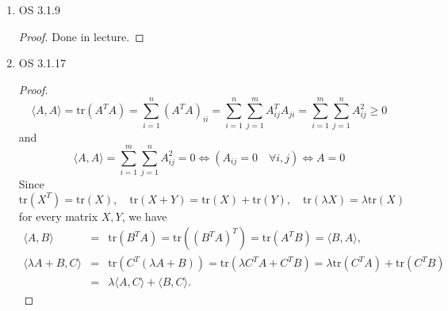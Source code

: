 \documentclass{amsart}
\begin{document}
\begin{enumerate}
\begin{proof}
	To prove it's an isomorphism, we only need that it's injective, i.e. $\ker(\pi^*)=0$.
	
	Let $f$ be a linear functional on $V/U$. Suppose $\pi^*(f)=0$, then $f(v+U)=0$ for all $v$, which means that $f={\bf 0}$ (the zero vector in $(V/U)^*$), therefore $\ker(\pi^*)=\{0\}$, hence $\pi^*$ is injective.
	
	Therefore $\pi*$ is a bijective linear map from $(V/U)^*$ and $U^0$, thus an isomorphism.
	
\end{proof}
\item {OS 3.1.9}
\begin{proof}
Done in lecture.
\end{proof}
		\item {OS 3.1.17} 
		\begin{proof}
	
			
			\[\langle A,A\rangle=\text{tr}(A^TA)=\sum_{i=1}^n(A^TA)_{ii}=\sum_{i=1}^n\sum_{j=1}^mA^T_{ij}A_{ji}=\sum_{i=1}^m\sum_{j=1}^nA_{ij}^2 \ge 0\]
			and
			\[\langle A,A\rangle=\sum_{i=1}^m\sum_{j=1}^nA_{ij}^2 = 0\iff (A_{ij}=0 \quad \forall i,j) \iff A=0\]
			Since $\text{tr}(X^T)=\text{tr}(X), \quad \text{tr}(X+Y)=\text{tr}(X)+\text{tr}(Y), \quad \text{tr}(\lambda X)=\lambda\text{tr}(X)$ for every matrix $X,Y$, we have
			\begin{eqnarray*}
\langle A,B\rangle&=&\text{tr}(B^TA)=\text{tr}((B^TA)^T)=\text{tr}(A^TB)=\langle B,A\rangle,\\
\langle \lambda A+B,C\rangle&=&\text{tr}(C^T(\lambda A+B))=\text{tr}(\lambda C^TA+C^TB)=\lambda\text{tr}(C^TA)+\text{tr}(C^TB)\\
&=&\lambda\langle A,C\rangle+\langle B,C\rangle.
\end{eqnarray*}
		\end{proof}
	 	\end{enumerate}
	 	
	
\end{document}
